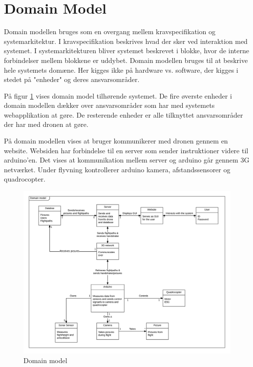 \section{Domain Model}

Domain modellen bruges som en overgang mellem kravspecifikation og systemarkitektur. 
I kravspecifikation beskrives hvad der sker ved interaktion med systemet. I systemarkitekturen bliver systemet beskrevet i blokke, hvor de interne forbindelser mellem blokkene er uddybet. Domain modellen bruges til at beskrive hele systemets domæne. Her kigges ikke på hardware vs. software, der kigges i stedet på "enheder" og deres ansvarsområder.

På figur \ref{fig:domain_model} vises domain model tilhørende systemet. De fire øverste enheder i domain modellen dækker over ansvarsområder som har med systemets webapplikation at gøre. De resterende enheder er alle tilknyttet ansvarsområder der har med dronen at gøre.

På domain modellen vises at bruger kommunikerer med dronen gennem en website. Websiden har forbindelse til en server som sender instruktioner videre til arduino'en. Det vises at kommunikation mellem server og arduino går gennem 3G netværket. Under flyvning kontrollerer arduino kamera, afstandssensorer og quadrocopter. 

\vspace{-5pt}
\begin{figure}[H]
	\centering
	\includegraphics[width=1.\textwidth]{Billeder/domain_model.png}
	\caption{Domain model}
	\label{fig:domain_model}
\end{figure}